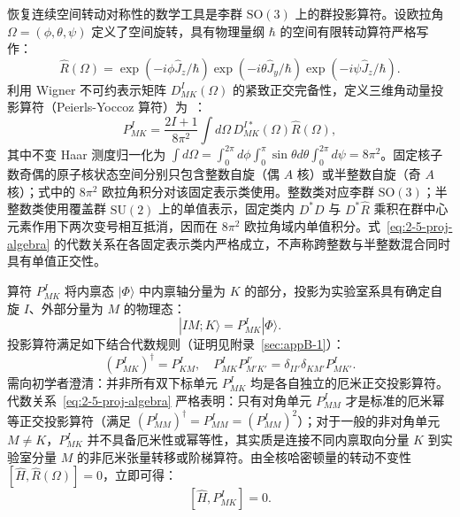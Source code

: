 恢复连续空间转动对称性的数学工具是李群 $\mathrm{SO}(3)$ 上的群投影算符。设欧拉角 $\Omega = (\phi, \theta, \psi)$ 定义了空间旋转，具有物理量纲 $\hbar$ 的空间有限转动算符严格写作：
\begin{equation}\label{eq:2-5-rot-op}
\hat{R}(\Omega) = \exp(-i \phi \hat{J}_z / \hbar) \exp(-i \theta \hat{J}_y / \hbar) \exp(-i \psi \hat{J}_z / \hbar).
\end{equation}
利用 Wigner 不可约表示矩阵 $D^I_{MK}(\Omega)$ 的紧致正交完备性，定义三维角动量投影算符（Peierls-Yoccoz 算符）为~\cite{book-suhonen-from-nucleons-to-nucleus,book-raduta-coherent-states}：
\begin{equation}\label{eq:2-5-proj-op}
P^I_{MK} = \frac{2I+1}{8\pi^2} \int d\Omega \, D^{I*}_{MK}(\Omega) \hat{R}(\Omega),
\end{equation}
其中不变 Haar 测度归一化为 $\int d\Omega = \int_0^{2\pi} d\phi \int_0^\pi \sin\theta d\theta \int_0^{2\pi} d\psi = 8\pi^2$。固定核子数奇偶的原子核状态空间分别只包含整数自旋（偶 $A$ 核）或半整数自旋（奇 $A$ 核）；式中的 $8\pi^2$ 欧拉角积分对该固定表示类使用。整数类对应李群 $\mathrm{SO}(3)$；半整数类使用覆盖群 $\mathrm{SU}(2)$ 上的单值表示，固定类内 $D^* D$ 与 $D^* \hat{R}$ 乘积在群中心元素作用下两次变号相互抵消，因而在 $8\pi^2$ 欧拉角域内单值积分。式~\eqref{eq:2-5-proj-algebra} 的代数关系在各固定表示类内严格成立，不声称跨整数与半整数混合同时具有单值正交性。

算符 $P^I_{MK}$ 将内禀态 $|\Phi\rangle$ 中内禀轴分量为 $K$ 的部分，投影为实验室系具有确定自旋 $I$、外部分量为 $M$ 的物理态：
\begin{equation}\label{eq:2-5-projected-state}
|IM; K\rangle = P^I_{MK} |\Phi\rangle.
\end{equation}
投影算符满足如下结合代数规则（证明见附录~\ref{sec:appB-1}）：
\begin{equation}\label{eq:2-5-proj-algebra}
(P^I_{MK})^\dagger = P^I_{KM}, \quad P^I_{MK} P^{I'}_{M'K'} = \delta_{II'} \delta_{KM'} P^I_{MK'}.
\end{equation}
需向初学者澄清：并非所有双下标单元 $P^I_{MK}$ 均是各自独立的厄米正交投影算符。代数关系~\eqref{eq:2-5-proj-algebra} 严格表明：只有对角单元 $P^I_{MM}$ 才是标准的厄米幂等正交投影算符（满足 $(P^I_{MM})^\dagger = P^I_{MM} = (P^I_{MM})^2$）；对于一般的非对角单元 $M \ne K$，$P^I_{MK}$ 并不具备厄米性或幂等性，其实质是连接不同内禀取向分量 $K$ 到实验室分量 $M$ 的非厄米张量转移或阶梯算符。由全核哈密顿量的转动不变性 $[\hat{H}, \hat{R}(\Omega)] = 0$，立即可得：
\begin{equation}\label{eq:2-5-H-P-commute}
[\hat{H}, P^I_{MK}] = 0.
\end{equation}

